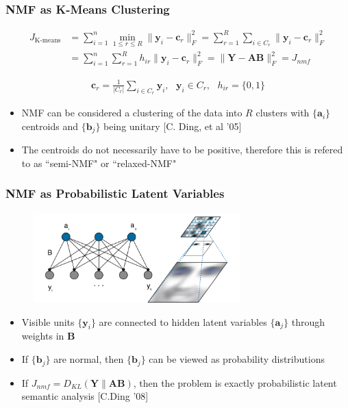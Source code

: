\documentclass{beamer}
\begin{document}
\begin{frame}
\frametitle{NMF as K-Means Clustering}

\vspace*{-1cm}
\begin{align*}
J_{\text{K-means}} &= \sum_{i=1}^{n}{\min_{1\le r \le R}{\|\mathbf{y}_i-\mathbf{c}_r\|_F^2}} = \sum_{r=1}^R \sum_{i \in C_r} \|\mathbf{y}_i - \mathbf{c}_r\|_F^2 \\
&= \sum_{i=1}^{n}\sum_{r=1}^{R}{h_{ir}\|\mathbf{y}_i-\mathbf{c}_r\|_F^2} = \|\mathbf{Y} - \mathbf{A}\mathbf{B}\|_F^2 = J_{nmf}
\end{align*}

\begin{align*}
\mathbf{c}_r = \frac{1}{|C_r|}\sum_{i \in C_r}{\mathbf{y}_i}, \ \ \ \mathbf{y}_i \in C_r, \ \ \ h_{ir} = \{0,1\}
\end{align*}

\begin{itemize}
\item NMF can be considered a clustering of the data into $R$ clusters with $\{\mathbf{a}_i\}$ centroids and $\{\mathbf{b}_j\}$ being unitary [C. Ding, et al '05]
\item The centroids do not necessarily have to be positive, therefore this is refered to as ``semi-NMF" or ``relaxed-NMF"
\end{itemize}

\end{frame}

\begin{frame}
\frametitle{NMF as Probabilistic Latent Variables}
\begin{figure}
  \vspace*{-1cm}
  \includegraphics[width=8cm,center]{lee4}
\end{figure}

\begin{itemize}
\item Visible units $\{\mathbf{y}_i\}$ are connected to hidden latent variables $\{\mathbf{a}_j\}$ through weights in $\mathbf{B}$
\item If $\{\mathbf{b}_j\}$ are normal, then $\{\mathbf{b}_j\}$ can be viewed as probability distributions
\item If $J_{nmf} = D_{KL}(\mathbf{Y}\|\mathbf{A}\mathbf{B})$, then the problem is exactly probabilistic latent semantic analysis [C.Ding '08]
\end{itemize}
\end{frame}
\end{document}
